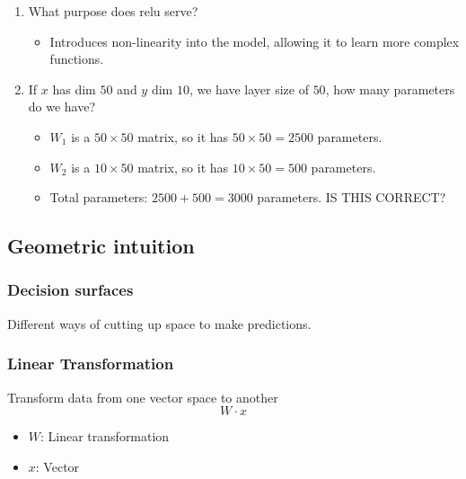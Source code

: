 \begin{example}
    \begin{enumerate}
        \item What purpose does relu serve? 
            \begin{itemize}
                \item Introduces non-linearity into the model, allowing it to learn more complex functions.
            \end{itemize}       
        \item If $x$ has dim $50$ and $y$ dim $10$, we have layer size of $50$, how many parameters do we have?
            \begin{itemize}
                \item $W_1$ is a $50 \times 50$ matrix, so it has $50 \times 50 = 2500$ parameters.
                \item $W_2$ is a $10 \times 50$ matrix, so it has $10 \times 50 = 500$ parameters.
                \item Total parameters: $2500 + 500 = 3000$ parameters. IS THIS CORRECT?
            \end{itemize} 
    \end{enumerate}
\end{example}

\subsection{Geometric intuition}
\subsubsection{Decision surfaces}
\begin{notes} 
    Different ways of cutting up space to make predictions.
\end{notes}

\subsubsection{Linear Transformation}
\begin{notes} 
    Transform data from one vector space to another
    \begin{equation}
        W \cdot x 
    \end{equation}
    \begin{itemize}
        \item $W$: Linear transformation
        \item $x$: Vector
    \end{itemize}
\end{notes}

